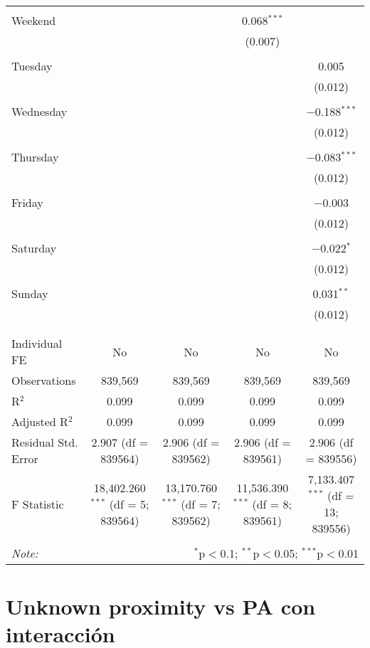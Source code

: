 \documentclass[
]{article}
\begin{document}
\begin{table}[!htbp]
{\begin{tabular}{@{\extracolsep{5pt}}lcccc}
  & & & & \\ 
 Weekend &  &  & 0.068$^{***}$ &  \\ 
  &  &  & (0.007) &  \\ 
  & & & & \\ 
 Tuesday &  &  &  & 0.005 \\ 
  &  &  &  & (0.012) \\ 
  & & & & \\ 
 Wednesday &  &  &  & $-$0.188$^{***}$ \\ 
  &  &  &  & (0.012) \\ 
  & & & & \\ 
 Thursday &  &  &  & $-$0.083$^{***}$ \\ 
  &  &  &  & (0.012) \\ 
  & & & & \\ 
 Friday &  &  &  & $-$0.003 \\ 
  &  &  &  & (0.012) \\ 
  & & & & \\ 
 Saturday &  &  &  & $-$0.022$^{*}$ \\ 
  &  &  &  & (0.012) \\ 
  & & & & \\ 
 Sunday &  &  &  & 0.031$^{**}$ \\ 
  &  &  &  & (0.012) \\ 
  & & & & \\ 
\hline \\[-1.8ex] 
Individual FE & No & No & No & No \\ 
Observations & 839,569 & 839,569 & 839,569 & 839,569 \\ 
R$^{2}$ & 0.099 & 0.099 & 0.099 & 0.099 \\ 
Adjusted R$^{2}$ & 0.099 & 0.099 & 0.099 & 0.099 \\ 
Residual Std. Error & 2.907 (df = 839564) & 2.906 (df = 839562) & 2.906 (df = 839561) & 2.906 (df = 839556) \\ 
F Statistic & 18,402.260$^{***}$ (df = 5; 839564) & 13,170.760$^{***}$ (df = 7; 839562) & 11,536.390$^{***}$ (df = 8; 839561) & 7,133.407$^{***}$ (df = 13; 839556) \\ 
\hline 
\hline \\[-1.8ex] 
\textit{Note:}  & \multicolumn{4}{r}{$^{*}$p$<$0.1; $^{**}$p$<$0.05; $^{***}$p$<$0.01} \\ 
\end{tabular}
} 
\end{table} 
\newpage
\section{Unknown proximity vs PA con interacción}
\end{document}
